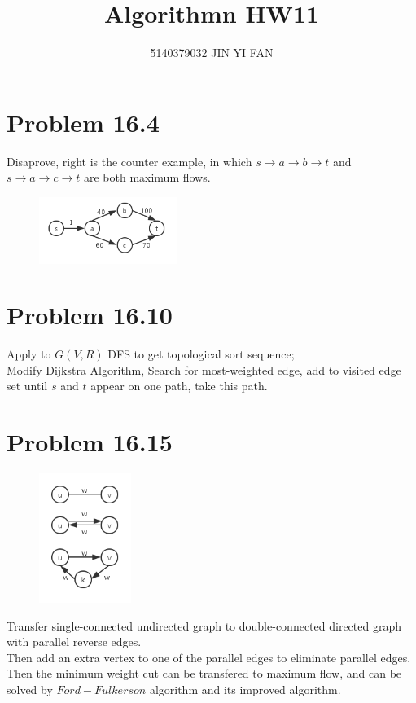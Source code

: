 \documentclass[a4paper]{article}
\title{\textbf{Algorithmn HW11}}
\author{5140379032 JIN YI FAN}
\date{}
\begin{document}
\maketitle
\begin{spacing}{1.3}
\section*{Problem 16.4}
\begin{multicols}{2}
Disaprove, right is the counter example, in which $s\rightarrow a\rightarrow b\rightarrow t$ and $s\rightarrow a\rightarrow c\rightarrow t$ are both maximum flows.
\begin{figure}[H]
    \centering
    \includegraphics[width=4.5cm]{11-1.png}
\end{figure}
\end{multicols}

\section*{Problem 16.10}
Apply to $G(V,R)$ DFS to get topological sort sequence;
\\Modify Dijkstra Algorithm, Search for most-weighted edge, add to visited edge set until $s$ and $t$ appear on one path, take this path.

\section*{Problem 16.15}
\begin{multicols}{2}
\begin{figure}[H]
    \centering
    \includegraphics[width=3cm]{11-3.png}
\end{figure}
Transfer single-connected undirected graph to double-connected directed graph with parallel reverse edges.
\\Then add an extra vertex to one of the parallel edges to eliminate parallel edges.
\\Then the minimum weight cut can be transfered to maximum flow, and can be solved by $Ford-Fulkerson$ algorithm and its improved algorithm.
\end{multicols}


\end{spacing}
\end{document}
